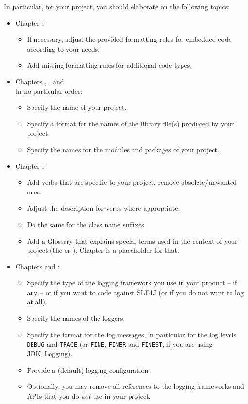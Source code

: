 In particular, for your project, you should elaborate on the following topics:
\begin{itemize}
    \item{Chapter :
        \begin{itemize}
        	    \item{If necessary, adjust the provided formatting rules for embedded code according to your needs.}
        	    \item{Add missing formatting rules for additional code types.}
        \end{itemize}}
	\item{Chapters , ,  and \\
	In no particular order:
	    \begin{itemize}
		    \item{Specify the name of your project.}
		    \item{Specify a format for the names of the library file(s) produced by your project.}
		    \item{Specify the names for the modules and packages of your project.}
	    \end{itemize}}
		\item{Chapter :
		    \begin{itemize}
			    \item{Add verbs that are specific to your project, remove obsolete/unwanted ones.}
			    \item{Adjust the description for verbs where appropriate.}
		    	\item{Do the same for the class name suffixes.}
		    	\item{Add a Glossary that explains special terms used in the context of your project (the  or ). Chapter  is a placeholder for that.}
	    \end{itemize}}
	

	\item{Chapters  and :
	    \begin{itemize}
		    \item{Specify the type of the logging framework you use in your product – if any – or if you want to code against SLF4J (or if you do not want to log at all).}
		    \item{Specify the names of the loggers.}
		    \item{Specify the format for the log messages, in particular for the log levels \verb#DEBUG# and \verb#TRACE# (or \verb#FINE#, \verb#FINER# and \verb#FINEST#, if you are using JDK~Logging).}
		    \item{Provide a (default) logging configuration.}
		    \item{Optionally, you may remove all references to the logging frameworks and APIs that you do \textit{not} use in your project.}
	    \end{itemize}}
	    

\end{itemize}
